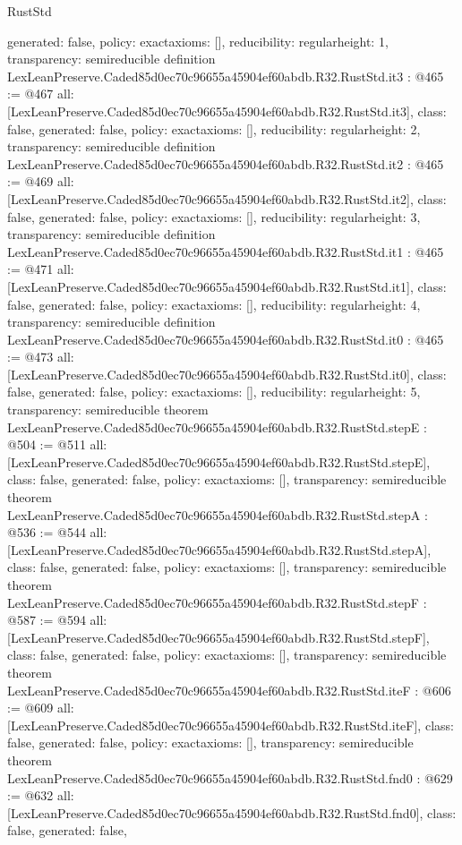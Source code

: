 \begin{lexlean}{RustStd}
\begin{coremodule}
{  generated: false,
  policy: exact{axioms: []},
  reducibility: regular{height: 1},
  transparency: semireducible
}
definition LexLeanPreserve.Caded85d0ec70c96655a45904ef60abdb.R32.RustStd.it3 : @465 := @467 {
  all: [LexLeanPreserve.Caded85d0ec70c96655a45904ef60abdb.R32.RustStd.it3],
  class: false,
  generated: false,
  policy: exact{axioms: []},
  reducibility: regular{height: 2},
  transparency: semireducible
}
definition LexLeanPreserve.Caded85d0ec70c96655a45904ef60abdb.R32.RustStd.it2 : @465 := @469 {
  all: [LexLeanPreserve.Caded85d0ec70c96655a45904ef60abdb.R32.RustStd.it2],
  class: false,
  generated: false,
  policy: exact{axioms: []},
  reducibility: regular{height: 3},
  transparency: semireducible
}
definition LexLeanPreserve.Caded85d0ec70c96655a45904ef60abdb.R32.RustStd.it1 : @465 := @471 {
  all: [LexLeanPreserve.Caded85d0ec70c96655a45904ef60abdb.R32.RustStd.it1],
  class: false,
  generated: false,
  policy: exact{axioms: []},
  reducibility: regular{height: 4},
  transparency: semireducible
}
definition LexLeanPreserve.Caded85d0ec70c96655a45904ef60abdb.R32.RustStd.it0 : @465 := @473 {
  all: [LexLeanPreserve.Caded85d0ec70c96655a45904ef60abdb.R32.RustStd.it0],
  class: false,
  generated: false,
  policy: exact{axioms: []},
  reducibility: regular{height: 5},
  transparency: semireducible
}
theorem LexLeanPreserve.Caded85d0ec70c96655a45904ef60abdb.R32.RustStd.stepE : @504 := @511 {
  all: [LexLeanPreserve.Caded85d0ec70c96655a45904ef60abdb.R32.RustStd.stepE],
  class: false,
  generated: false,
  policy: exact{axioms: []},
  transparency: semireducible
}
theorem LexLeanPreserve.Caded85d0ec70c96655a45904ef60abdb.R32.RustStd.stepA : @536 := @544 {
  all: [LexLeanPreserve.Caded85d0ec70c96655a45904ef60abdb.R32.RustStd.stepA],
  class: false,
  generated: false,
  policy: exact{axioms: []},
  transparency: semireducible
}
theorem LexLeanPreserve.Caded85d0ec70c96655a45904ef60abdb.R32.RustStd.stepF : @587 := @594 {
  all: [LexLeanPreserve.Caded85d0ec70c96655a45904ef60abdb.R32.RustStd.stepF],
  class: false,
  generated: false,
  policy: exact{axioms: []},
  transparency: semireducible
}
theorem LexLeanPreserve.Caded85d0ec70c96655a45904ef60abdb.R32.RustStd.iteF : @606 := @609 {
  all: [LexLeanPreserve.Caded85d0ec70c96655a45904ef60abdb.R32.RustStd.iteF],
  class: false,
  generated: false,
  policy: exact{axioms: []},
  transparency: semireducible
}
theorem LexLeanPreserve.Caded85d0ec70c96655a45904ef60abdb.R32.RustStd.fnd0 : @629 := @632 {
  all: [LexLeanPreserve.Caded85d0ec70c96655a45904ef60abdb.R32.RustStd.fnd0],
  class: false,
  generated: false,
}
\end{coremodule}
\end{lexlean}
